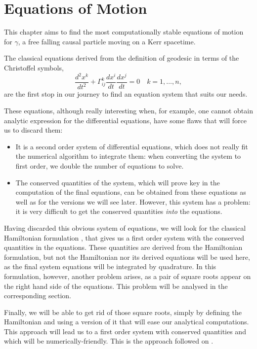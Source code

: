\chapter{Equations of Motion}
\label{chapter:equations}

This chapter aims to find the most computationally stable equations of motion for $\gamma$, a free falling causal particle moving on a Kerr spacetime.

The classical equations derived from the definition of geodesic in terms of the Christoffel symbols,
\[
	\frac{d^2x^k}{dt^2} + \Gamma^k_{ij} \frac{d x^i}{dt} \frac{d x^j}{dt} = 0 \quad k = 1, \dots, n,
\]
are the first stop in our journey to find an equation system that suits our needs.

These equations, although really interesting when, for example, one cannot obtain analytic expression for the differential equations, have some flaws that will force us to discard them:
\begin{itemize}
	\item It is a second order system of differential equations, which does not really fit the numerical algorithm to integrate them: when converting the system to first order, we double the number of equations to solve.
	\item The conserved quantities of the system, which will prove key in the computation of the final equations, can be obtained from these equations as well as for the versions we will see later. However, this system has a problem: it is very difficult to get the conserved quantities \emph{into} the equations.
\end{itemize}

Having discarded this obvious system of equations, we will look for the classical Hamiltonian formulation \cite[Sec. 33.5]{thorne73}, that gives us a first order system with the conserved quantities in the equations. These quantities are derived from the Hamiltonian formulation, but not the Hamiltonian nor its derived equations will be used here, as the final system equations will be integrated by quadrature. In this formulation, however, another problem arises, as a pair of square roots appear on the right hand side of the equations. This problem will be analysed in the corresponding section.

Finally, we will be able to get rid of those square roots, simply by defining the Hamiltonian and using a version of it that will ease our analytical computations. This approach will lead us to a first order system with conserved quantities and which will be numerically-friendly. This is the approach followed on \cite{thorne15}.

